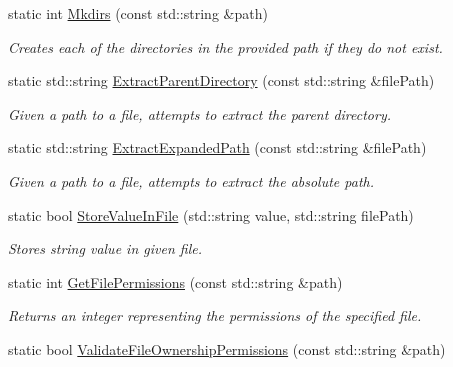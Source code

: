 \begin{DoxyCompactItemize}
\item 
static int \hyperlink{class_aws_1_1_iot_1_1_device_client_1_1_util_1_1_file_utils_acec1cd53ec38fcb34606141443dec4fe}{Mkdirs} (const std\+::string \&path)
\begin{DoxyCompactList}\small\item\em Creates each of the directories in the provided path if they do not exist. \end{DoxyCompactList}\item 
static std\+::string \hyperlink{class_aws_1_1_iot_1_1_device_client_1_1_util_1_1_file_utils_a137435480bde485798fe38cb63ae6b0d}{Extract\+Parent\+Directory} (const std\+::string \&file\+Path)
\begin{DoxyCompactList}\small\item\em Given a path to a file, attempts to extract the parent directory. \end{DoxyCompactList}\item 
static std\+::string \hyperlink{class_aws_1_1_iot_1_1_device_client_1_1_util_1_1_file_utils_ae1e32f8a3f157e2753c5eba96e7e3cd4}{Extract\+Expanded\+Path} (const std\+::string \&file\+Path)
\begin{DoxyCompactList}\small\item\em Given a path to a file, attempts to extract the absolute path. \end{DoxyCompactList}\item 
static bool \hyperlink{class_aws_1_1_iot_1_1_device_client_1_1_util_1_1_file_utils_a61556e62cd69ac493b7515d454927818}{Store\+Value\+In\+File} (std\+::string value, std\+::string file\+Path)
\begin{DoxyCompactList}\small\item\em Stores string value in given file. \end{DoxyCompactList}\item 
static int \hyperlink{class_aws_1_1_iot_1_1_device_client_1_1_util_1_1_file_utils_a19750e263a09c001b4d403ebcfee3472}{Get\+File\+Permissions} (const std\+::string \&path)
\begin{DoxyCompactList}\small\item\em Returns an integer representing the permissions of the specified file. \end{DoxyCompactList}\item 
static bool \hyperlink{class_aws_1_1_iot_1_1_device_client_1_1_util_1_1_file_utils_ab96cf791fb6c6093216c111d7d095ee9}{Validate\+File\+Ownership\+Permissions} (const std\+::string \&path)

\end{DoxyCompactItemize}
